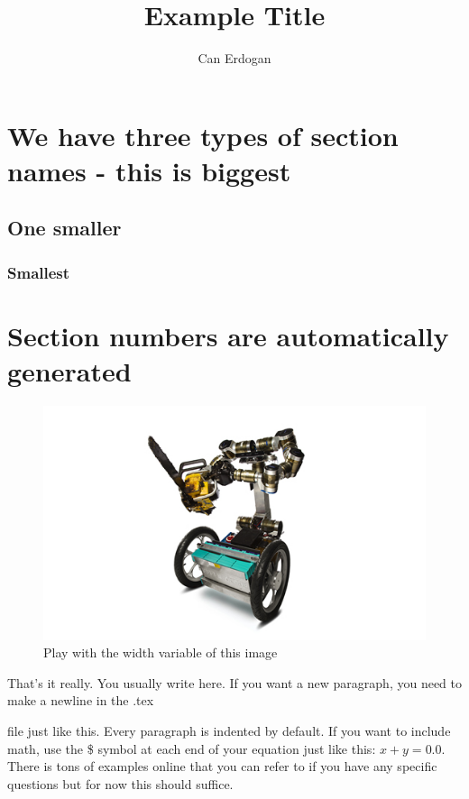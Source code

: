 \documentclass[a4paper,10pt]{article}
\title{Example Title}
\author{Can Erdogan}
\begin{document}
\maketitle

\section{We have three types of section names - this is biggest}


\subsection{One smaller}
\subsubsection{Smallest}

\section{Section numbers are automatically generated}

\begin{figure}[!ht] 
  \centering
  \includegraphics[width=1.0\columnwidth]{ex3.jpg}
  \caption{Play with the width variable of this image}
\end{figure}

That's it really. You usually write here. If you want a new paragraph, you need to make a newline
in the .tex

file just like this. Every paragraph is indented by default. If you want to include math, use
the \$ symbol at each end of your equation just like this: $x + y = 0.0$. There is tons of examples
online that you can refer to if you have any specific questions but for now this should suffice. 
\end{document}
